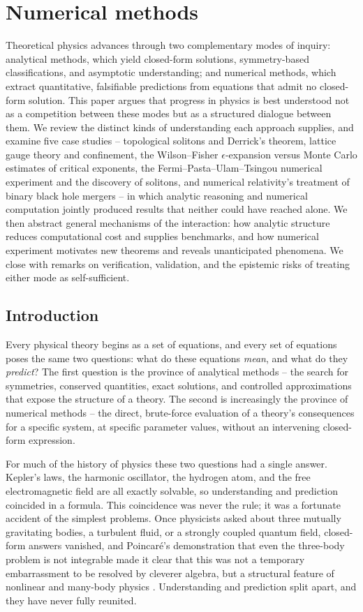 \chapter{Numerical methods}
\label{numeric}
 Theoretical physics advances through two complementary modes of inquiry:
 analytical methods, which yield closed-form solutions, symmetry-based
 classifications, and asymptotic understanding; and numerical methods, which
 extract quantitative, falsifiable predictions from equations that admit no
 closed-form solution. This paper argues that progress in physics is best
 understood not as a competition between these modes but as a structured
 dialogue between them. We review the distinct kinds of understanding each
 approach supplies, and examine five case studies -- topological solitons and
 Derrick's theorem, lattice gauge theory and confinement, the Wilson--Fisher
 $\epsilon$-expansion versus Monte Carlo estimates of critical exponents, the
 Fermi--Pasta--Ulam--Tsingou numerical experiment and the discovery of
 solitons, and numerical relativity's treatment of binary black hole mergers --
 in which analytic reasoning and numerical computation jointly produced results
 that neither could have reached alone. We then abstract general mechanisms of
 the interaction: how analytic structure reduces computational cost and
 supplies benchmarks, and how numerical experiment motivates new theorems and
 reveals unanticipated phenomena. We close with remarks on verification,
 validation, and the epistemic risks of treating either mode as
 self-sufficient.

\section{Introduction}

Every physical theory begins as a set of equations, and every set of equations
poses the same two questions: what do these equations \emph{mean}, and what do
they \emph{predict}? The first question is the province of analytical methods
-- the search for symmetries, conserved quantities, exact solutions, and
controlled approximations that expose the structure of a theory. The second is
increasingly the province of numerical methods -- the direct, brute-force
evaluation of a theory's consequences for a specific system, at specific
parameter values, without an intervening closed-form expression.

For much of the history of physics these two questions had a single answer.
Kepler's laws, the harmonic oscillator, the hydrogen atom, and the free
electromagnetic field are all exactly solvable, so understanding and prediction
coincided in a formula. This coincidence was never the rule; it was a fortunate
accident of the simplest problems. Once physicists asked about three mutually
gravitating bodies, a turbulent fluid, or a strongly coupled quantum field,
closed-form answers vanished, and Poincar\'e's demonstration that even the
three-body problem is not integrable made it clear that this was not a
temporary embarrassment to be resolved by cleverer algebra, but a structural
feature of nonlinear and many-body physics \cite{Poincare1890}. Understanding
and prediction split apart, and they have never fully reunited.

